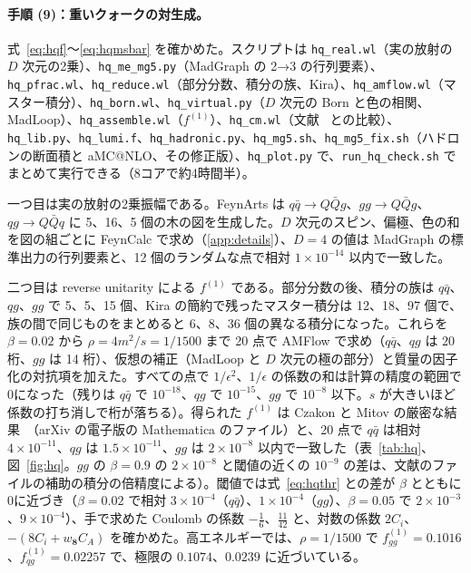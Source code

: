 \documentclass[a4paper,10pt]{ltjsarticle}
\begin{document}
\paragraph{手順 (9)：重いクォークの対生成。}式~\eqref{eq:hqf}〜\eqref{eq:hqmsbar} を確かめた。スクリプトは \texttt{hq\_real.wl}（実の放射の $D$ 次元の2乗）、\texttt{hq\_me\_mg5.py}（MadGraph の 2→3 の行列要素）、\texttt{hq\_pfrac.wl}、\texttt{hq\_reduce.wl}（部分分数、積分の族、Kira）、\texttt{hq\_amflow.wl}（マスター積分）、\texttt{hq\_born.wl}、\texttt{hq\_virtual.py}（$D$ 次元の Born と色の相関、MadLoop）、\texttt{hq\_assemble.wl}（$f^{(1)}$）、\texttt{hq\_cm.wl}（文献~\cite{cm10} との比較）、\texttt{hq\_lib.py}、\texttt{hq\_lumi.f}、\texttt{hq\_hadronic.py}、\texttt{hq\_mg5.sh}、\texttt{hq\_mg5\_fix.sh}（ハドロンの断面積と aMC@NLO、その修正版）、\texttt{hq\_plot.py} で、\texttt{run\_hq\_check.sh} でまとめて実行できる（8コアで約4時間半）。

一つ目は実の放射の2乗振幅である。FeynArts は $q\bar q\to Q\bar Qg$、$gg\to Q\bar Qg$、$qg\to Q\bar Qq$ に 5、16、5 個の木の図を生成した。$D$ 次元のスピン、偏極、色の和を図の組ごとに FeynCalc で求め（\ref{app:details}）、$D=4$ の値は MadGraph の標準出力の行列要素と、12 個のランダムな点で相対 $1\times10^{-14}$ 以内で一致した。

二つ目は reverse unitarity による $f^{(1)}$ である。部分分数の後、積分の族は $q\bar q$、$qg$、$gg$ で 5、5、15 個、Kira の簡約で残ったマスター積分は 12、18、97 個で、族の間で同じものをまとめると 6、8、36 個の異なる積分になった。これらを $\beta=0.02$ から $\rho=4m^2/s=1/1500$ まで 20 点で AMFlow で求め（$q\bar q$、$qg$ は 20 桁、$gg$ は 14 桁）、仮想の補正（MadLoop と $D$ 次元の極の部分）と質量の因子化の対抗項を加えた。すべての点で $1/\epsilon^2$、$1/\epsilon$ の係数の和は計算の精度の範囲で0になった（残りは $q\bar q$ で $10^{-18}$、$qg$ で $10^{-15}$、$gg$ で $10^{-8}$ 以下。$s$ が大きいほど係数の打ち消しで桁が落ちる）。得られた $f^{(1)}$ は Czakon と Mitov の厳密な結果~\cite{cm10}（arXiv の電子版の Mathematica のファイル）と、20 点で $q\bar q$ は相対 $4\times10^{-11}$、$qg$ は $1.5\times10^{-11}$、$gg$ は $2\times10^{-8}$ 以内で一致した（表~\ref{tab:hq}、図~\ref{fig:hq}。$gg$ の $\beta=0.9$ の $2\times10^{-8}$ と閾値の近くの $10^{-9}$ の差は、文献のファイルの補助の積分の倍精度による）。閾値では式~\eqref{eq:hqthr} との差が $\beta$ とともに0に近づき（$\beta=0.02$ で相対 $3\times10^{-4}$（$q\bar q$）、$1\times10^{-4}$（$gg$）、$\beta=0.05$ で $2\times10^{-3}$、$9\times10^{-4}$）、手で求めた Coulomb の係数 $-\frac16$、$\frac{11}{42}$ と、対数の係数 $2C_i$、$-(8C_i+w_{\mathbf 8}C_A)$ を確かめた。高エネルギーでは、$\rho=1/1500$ で $f^{(1)}_{gg}=0.1016$、$f^{(1)}_{qg}=0.02257$ で、極限の $0.1074$、$0.0239$ に近づいている。
\end{document}

